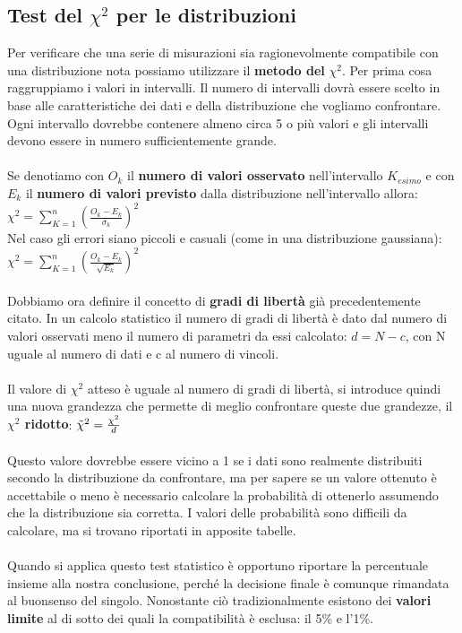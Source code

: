 \documentclass{article}
\begin{document}
\subsection{Test del $\chi^2$ per le distribuzioni}
Per verificare che una serie di misurazioni sia ragionevolmente compatibile con una distribuzione nota possiamo utilizzare il \textbf{metodo del} $\chi^2$. Per prima cosa raggruppiamo i valori in intervalli. Il numero di intervalli dovrà essere scelto in base alle caratteristiche dei dati e della distribuzione che vogliamo confrontare. Ogni intervallo dovrebbe contenere almeno circa 5 o più valori e gli intervalli devono essere in numero sufficientemente grande.\\\\
Se denotiamo con \textbf{$O_k$} il \textbf{numero di valori osservato} nell'intervallo $K_{esimo}$ e con \textbf{$E_k$} il \textbf{numero di valori previsto} dalla distribuzione nell'intervallo allora: $\chi^2 = \sum_{K=1} ^n \left(\frac{O_k - E_k}{\sigma_k} \right)^2$\\  
Nel caso gli errori siano piccoli e casuali (come in una distribuzione gaussiana): $\chi^2 = \sum_{K=1} ^n \left(\frac{O_k - E_k}{\sqrt{E_k}} \right)^2$\\\\
Dobbiamo ora definire il concetto di \textbf{gradi di libertà} già precedentemente citato. In un calcolo statistico il numero di gradi di libertà è dato dal numero di valori osservati meno il numero di parametri da essi calcolato: $d = N - c$, con N uguale al numero di dati e c al numero di vincoli.\\\\
Il valore di $\chi^2$ atteso è uguale al numero di gradi di libertà, si introduce quindi una nuova grandezza che permette di meglio confrontare queste due grandezze, il \textbf{$\chi^2$ ridotto}: $\Tilde{\chi}^2 = \frac{\chi^2}{d}$\\\\
Questo valore dovrebbe essere vicino a 1 se i dati sono realmente distribuiti secondo la distribuzione da confrontare, ma per sapere se un valore ottenuto è accettabile o meno è necessario calcolare la probabilità di ottenerlo assumendo che la distribuzione sia corretta. I valori delle probabilità sono difficili da calcolare, ma si trovano riportati in apposite tabelle.\\\\
Quando si applica questo test statistico è opportuno riportare la percentuale insieme alla nostra conclusione, perché la decisione finale è comunque rimandata al buonsenso del singolo. Nonostante ciò tradizionalmente esistono dei \textbf{valori limite} al di sotto dei quali la compatibilità è esclusa: il 5\% e l'1\%.
\end{document}
